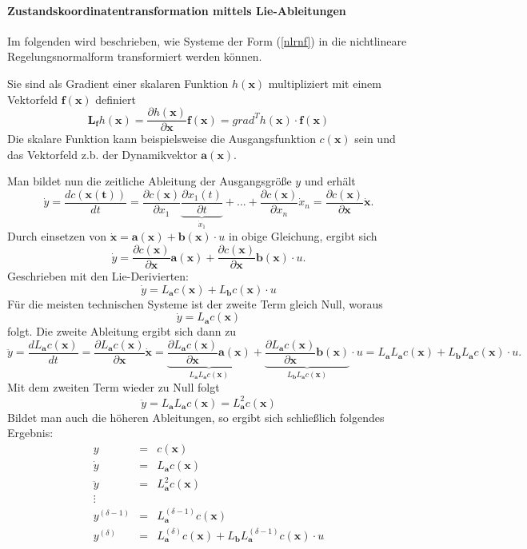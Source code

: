 		\paragraph{Zustandskoordinatentransformation mittels Lie-Ableitungen}
			Im folgenden wird beschrieben, wie Systeme der Form (\ref{nlrnf}) in die nichtlineare Regelungsnormalform transformiert werden können.\\
			\begin{tcolorbox}[title=Definition: \textit{Lie-Derivierte/Lie-Ableitung}]
				Sie sind als Gradient einer skalaren Funktion $ h(\bm{x}) $ multipliziert mit einem Vektorfeld $ \bm{f(x)} $ definiert
				\[\bm{L_{f}}h(\bm{x}) = \dfrac{\partial h(\bm{x})}{\partial\bm{x}}\bm{f(x)}=grad^{T}h(\bm{x})\cdot \bm{f(x)} \]	
				Die skalare Funktion kann beispielsweise die Ausgangsfunktion $ c(\bm{x}) $ sein und das Vektorfeld z.b. der Dynamikvektor $ \bm{a}(\bm{x}) $.
			\end{tcolorbox}
			Man bildet nun die zeitliche Ableitung der Ausgangsgröße $ y $ und erhält
			\[\dot{y}=\dfrac{dc(\bm{x(t)})}{dt} = \dfrac{\partial c(\bm{x})}{\partial x_{1}}\underbrace{\dfrac{\partial x_{1}(t)}{\partial t}}_{\dot{x}_{1}} + ... + \dfrac{\partial c(\bm{x})}{\partial x_{n}}\dot{x}_{n} = \dfrac{\partial c(\bm{x})}{\partial \bm{x}}\dot{\bm{x}}.\]
			Durch einsetzen von $ \dot{\bm{x}}=\bm{a(x) + b(x)}\cdot u $ in obige Gleichung, ergibt sich  
			\[\dot{y}=\dfrac{\partial c(\bm{x})}{\partial \bm{x}}\bm{a(x)} + \dfrac{\partial c(\bm{x})}{\partial \bm{x}}\bm{b(x)}\cdot u. \]
			Geschrieben mit den Lie-Derivierten:
			\[\dot{y}=L_{\bm{a}}c(\bm{x})+ L_{\bm{b}}c(\bm{x})\cdot u \]
			Für die meisten technischen Systeme ist der zweite Term gleich Null, woraus 
			\[\dot{y}=L_{\bm{a}}c(\bm{x})\]
			folgt.
			Die zweite Ableitung ergibt sich dann zu
			\[\ddot{y}= \dfrac{dL_{\bm{a}}c(\bm{x})}{dt}= \dfrac{\partial L_{\bm{a}}c(\bm{x})}{\partial \bm{x}}\dot{\bm{x}} = \underbrace{\dfrac{\partial L_{\bm{a}}c(\bm{x})}{\partial \bm{x}}\bm{a(x)}}_{L_{\bm{a}}L_{\bm{a}}c(\bm{x})}+\underbrace{\dfrac{\partial L_{\bm{a}}c(\bm{x})}{\partial \bm{x}}\bm{b(x)}}_{L_{\bm{b}}L_{\bm{a}}c(\bm{x})}\cdot u = L_{\bm{a}}L_{\bm{a}}c(\bm{x}) + L_{\bm{b}}L_{\bm{a}}c(\bm{x})\cdot u.\]
			Mit dem zweiten Term wieder zu Null folgt
			\[\ddot{y}=L_{\bm{a}}L_{\bm{a}}c(\bm{x}) = L_{\bm{a}}^{2}c(\bm{x})\]
			Bildet man auch die höheren Ableitungen, so ergibt sich schließlich folgendes Ergebnis:
			\begin{eqnarray} 
				y &=& c(\bm{x})\nonumber\\
				\dot{y}&=&L_{\bm{a}}c(\bm{x})\nonumber\\
				\ddot{y}&=&L_{\bm{a}}^{2}c(\bm{x})\nonumber\\
				\vdots \nonumber\\
				y^{(\delta-1)} &=&L_{\bm{a}}^{(\delta-1)}c(\bm{x})   \nonumber\\
				y^{(\delta)} &=&L_{\bm{a}}^{(\delta)}c(\bm{x}) + L_{\bm{b}}L_{\bm{a}}^{(\delta-1)}c(\bm{x})\cdot u   \nonumber\\
			\end{eqnarray}
